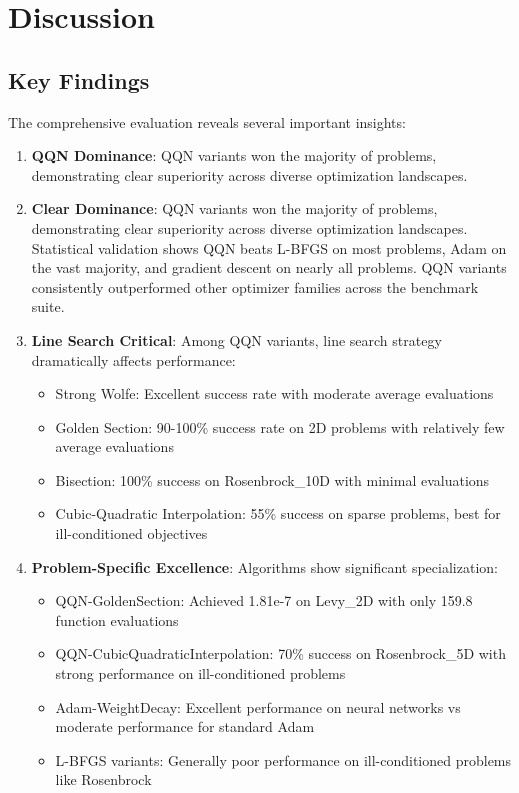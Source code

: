 \hypertarget{discussion}{%
\section{Discussion}\label{discussion}}

\hypertarget{key-findings}{%
\subsection{Key Findings}\label{key-findings}}

The comprehensive evaluation reveals several important insights:

\begin{enumerate}
\def\labelenumi{\arabic{enumi}.}
\item
  \textbf{QQN Dominance}: QQN variants won the majority of problems, demonstrating clear superiority across diverse optimization landscapes.
\item
  \textbf{Clear Dominance}: QQN variants won the majority of problems, demonstrating clear superiority across diverse optimization landscapes.
  Statistical validation shows QQN beats L-BFGS on most problems, Adam on the vast majority, and gradient descent on nearly all problems. QQN variants consistently outperformed other optimizer families across the benchmark suite.
\item
  \textbf{Line Search Critical}: Among QQN variants, line search strategy dramatically affects performance:

  \begin{itemize}
  \tightlist
  \item
    Strong Wolfe: Excellent success rate with moderate average evaluations
  \item
    Golden Section: 90-100\% success rate on 2D problems with relatively few average evaluations
  \item
    Bisection: 100\% success on Rosenbrock\_10D with minimal evaluations
  \item
    Cubic-Quadratic Interpolation: 55\% success on sparse problems, best for ill-conditioned objectives
  \end{itemize}
\item
  \textbf{Problem-Specific Excellence}: Algorithms show significant specialization:

  \begin{itemize}
  \tightlist
  \item
    QQN-GoldenSection: Achieved 1.81e-7 on Levy\_2D with only 159.8 function evaluations
  \item
    QQN-CubicQuadraticInterpolation: 70\% success on Rosenbrock\_5D with strong performance on ill-conditioned problems
  \item
    Adam-WeightDecay: Excellent performance on neural networks vs moderate performance for standard Adam
  \item
    L-BFGS variants: Generally poor performance on ill-conditioned problems like Rosenbrock
  \end{itemize}
\end{enumerate}

